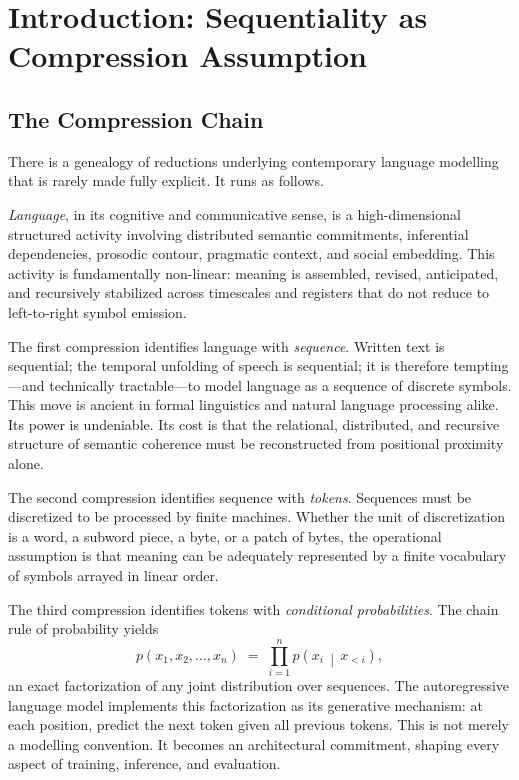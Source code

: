 \documentclass[11pt, a4paper]{article}
\theoremstyle{srn}
\theoremstyle{srnremark}
\begin{document}
\newpage

\tableofcontents
\vspace{2em}

\section{Introduction: Sequentiality as Compression Assumption}
\label{sec:intro}

\subsection{The Compression Chain}

There is a genealogy of reductions underlying contemporary language
modelling that is rarely made fully explicit.
It runs as follows.

\emph{Language}, in its cognitive and communicative sense, is a
high-dimensional structured activity involving distributed semantic
commitments, inferential dependencies, prosodic contour, pragmatic
context, and social embedding.
This activity is fundamentally non-linear: meaning is assembled,
revised, anticipated, and recursively stabilized across timescales and
registers that do not reduce to left-to-right symbol emission.

The first compression identifies language with \emph{sequence}.
Written text is sequential; the temporal unfolding of speech is
sequential; it is therefore tempting---and technically tractable---to
model language as a sequence of discrete symbols.
This move is ancient in formal linguistics and natural language
processing alike.
Its power is undeniable.
Its cost is that the relational, distributed, and recursive structure
of semantic coherence must be reconstructed from positional proximity
alone.

The second compression identifies sequence with \emph{tokens}.
Sequences must be discretized to be processed by finite machines.
Whether the unit of discretization is a word, a subword piece, a byte,
or a patch of bytes, the operational assumption is that meaning can be
adequately represented by a finite vocabulary of symbols arrayed in
linear order.

The third compression identifies tokens with \emph{conditional
probabilities}.
The chain rule of probability yields
\[
  p(x_1, x_2, \ldots, x_n)
  \;=\; \prod_{i=1}^n p\!\left(x_i \,\middle|\, x_{<i}\right),
\]
an exact factorization of any joint distribution over sequences.
The autoregressive language model implements this factorization as its
generative mechanism: at each position, predict the next token given
all previous tokens.
This is not merely a modelling convention.
It becomes an architectural commitment, shaping every aspect of
training, inference, and evaluation.
\end{document}
